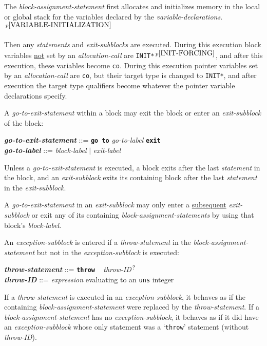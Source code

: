 \documentclass[12pt]{article}
\newcommand{\TT}[1]{{\tt \bfseries #1}}
\newcommand{\QMARK}{{$^{\,\mbox{\footnotesize ?}}$}}
\newcommand{\ttkey}[1]{{\tt \bfseries #1}}
\newcommand{\emkey}[1]{{\em \bfseries #1}}
\newcommand{\pagnote}[1]{$\,^{p\pageref{#1}}$}
\newenvironment{indpar}[1][0.3in]%
	{\begin{list}{}%
		     {\setlength{\itemsep}{0in}%
		      \setlength{\topsep}{0in}%
		      \setlength{\parsep}{1ex}%
		      \setlength{\labelwidth}{#1}%
		      \setlength{\leftmargin}{#1}%
		      \addtolength{\leftmargin}{\labelsep}}%
	 \item}%
	{\end{list}}
\begin{document}
The {\em block-assignment-statement}
first allocates and initializes memory in the local or global stack
for the variables declared by the {\em variable-declarations}.%
\pagnote{VARIABLE-INITIALIZATION}

Then any {\em statements} and
{\em exit-subblocks} are executed.  During this execution
block variables \underline{not} set by an {\em allocation-call}
are {\tt *INIT*}\pagnote{INIT-FORCING},
and after this execution, these variables become
{\tt co}.  During this execution pointer variables set by
an {\em allocation-call} are {\tt co}, but their target type is changed
to {\tt *INIT*}, and after execution the target type
qualifiers become whatever the pointer variable declarations specify.

A {\em go-to-exit-statement} within a block may exit the block or
enter an {\em exit-subblock} of the block:
\begin{indpar}
\emkey{go-to-exit-statement}\label{GO-TO-STATEMENT} ::=
    \ttkey{go to} {\em go-to-label} \TT{exit}
\\[0.5ex]
\emkey{go-to-label} ::= {\em block-label} $|$ {\em exit-label}
\end{indpar}

Unless a {\em go-to-exit-statement} is executed,
a block exits after the last {\em statement} in the block,
and an {\em exit-subblock} exits its containing block after the last
{\em statement} in the {\em exit-subblock}.

A {\em go-to-exit-statement} in an {\em exit-subblock} may only enter
a \underline{subsequent} {\em exit-subblock} or exit any of its containing
{\em block-assignment-statements} by using that block's {\em block-label}.

An {\em exception-subblock} is entered if a {\em throw-statement}
in the {\em block-assignment-state\-ment}
but not in the {\em exception-subblock} is executed:
\begin{indpar}
\emkey{throw-statement}\label{THROW-STATEMENT} ::=
    \ttkey{throw} ~ {\em throw-ID}\QMARK{} \\
\emkey{throw-ID} ::= {\em expression} evaluating to an {\tt uns} integer
\end{indpar}
If a {\em throw-statement} is executed in an
{\em exception-subblock}, it behaves as if the containing
{\em block-assignment-statement}
were replaced by the {\em throw-statement}.  If a
{\em block-assignment-statement} has no {\em exception-subblock},
it behaves as if it did have an {\em exception-subblock} whose only
statement was a `{\tt throw}' statement (without {\em throw-ID}).
\end{document}
